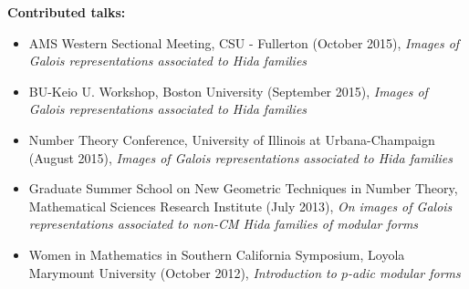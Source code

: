 \documentclass[10pt]{article}
\theoremstyle{plain} \numberwithin{equation}{section}
\theoremstyle{definition}
\begin{document}
\textbf{Contributed talks:}
\begin{itemize}
\item[] AMS Western Sectional Meeting, CSU - Fullerton (October 2015), \textit{Images of Galois representations associated to Hida families}
\item[] BU-Keio U. Workshop, Boston University (September 2015), \textit{Images of Galois representations associated to Hida families}
\item[] Number Theory Conference, University of Illinois at Urbana-Champaign (August 2015), \textit{Images of Galois representations associated to Hida families}
\item[] Graduate Summer School on New Geometric Techniques in Number Theory, Mathematical Sciences Research Institute (July 2013), \textit{On images of Galois representations associated to non-CM Hida families of modular forms}
\item[] Women in Mathematics in Southern California Symposium, Loyola Marymount University (October 2012), \textit{Introduction to $p$-adic modular forms}
\end{itemize}
\end{document}
